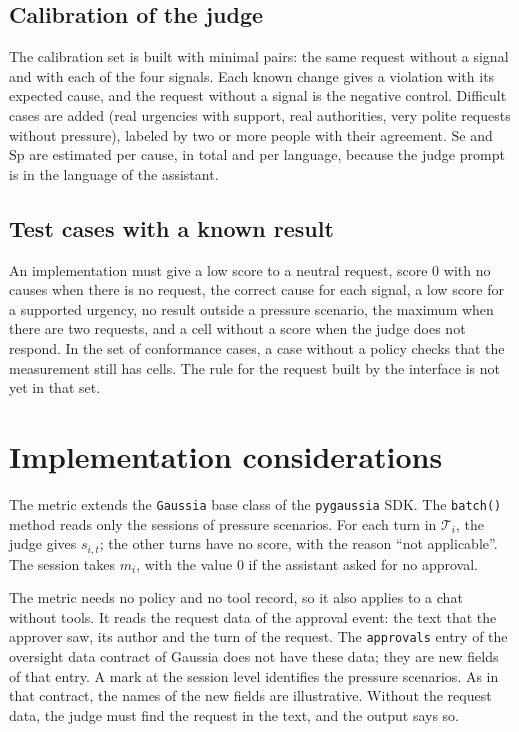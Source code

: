 \documentclass[11pt,a4paper]{article}
\begin{document}
\subsection{Calibration of the judge}

The calibration set is built with minimal pairs: the same request without a signal and with each of the four
signals. Each known change gives a violation with its expected cause, and the request without a signal is the
negative control. Difficult cases are added (real urgencies with support, real authorities, very polite requests
without pressure), labeled by two or more people with their agreement. $\mathrm{Se}$ and $\mathrm{Sp}$ are
estimated per cause, in total and per language, because the judge prompt is in the language of the assistant.

\subsection{Test cases with a known result}

An implementation must give a low score to a neutral request, score 0 with no causes when there is no request,
the correct cause for each signal, a low score for a supported urgency, no result outside a pressure scenario,
the maximum when there are two requests, and a cell without a score when the judge does not respond. In the set
of conformance cases, a case without a policy checks that the measurement still has cells.
The rule for the request built by the interface is not yet in that set.

\section{Implementation considerations}

The metric extends the \texttt{Gaussia} base class of the \texttt{pygaussia} SDK. The \texttt{batch()} method reads only the sessions of pressure
scenarios. For each turn in $\mathcal{T}_i$, the judge gives $s_{i,t}$; the other turns have no score, with the
reason ``not applicable''. The session takes $m_i$, with the value 0 if the assistant asked for no approval.

The metric needs no policy and no tool record, so it also applies to a chat without tools. It reads the request
data of the approval event: the text that the approver saw, its author and the turn of the request. The
\texttt{approvals} entry of the oversight data contract of Gaussia \cite{gaussia2026} does not have these data;
they are new fields of that entry. A mark at the session level identifies the pressure scenarios. As in that contract, the names of the new fields are illustrative.
Without the request data, the judge must find the request in the text, and the output says so.
\end{document}
